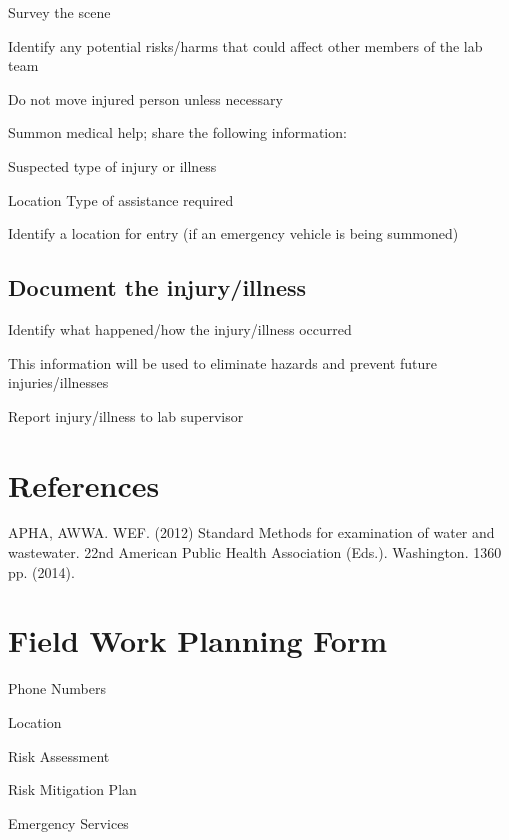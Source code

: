 \documentclass[12pt]{../SOP3_beta}\usepackage[]{graphicx}\usepackage[]{color}
\begin{document}
\NP Survey the scene

\NP Identify any potential risks/harms that could affect other members of the lab team

\NP Do not move injured person unless necessary

\NP Summon medical help; share the following information:

\NP Suspected type of injury or illness

\NP Location
\NP Type of assistance required

\NP Identify a location for entry (if an emergency vehicle is being summoned)

\subsection{Document the injury/illness}

\NP Identify what happened/how the injury/illness occurred

\NP This information will be used to eliminate hazards and prevent future injuries/illnesses

\NP Report injury/illness to lab supervisor

\section{References}

\NP APHA, AWWA. WEF. (2012) Standard Methods for examination of water and wastewater. 22nd American Public Health Association (Eds.). Washington. 1360 pp. (2014).

\newpage
\section{Field Work Planning Form}

\NP Phone Numbers

\NP Location

\NP Risk Assessment

\NP Risk Mitigation Plan

\NP Emergency Services 
\end{document}
